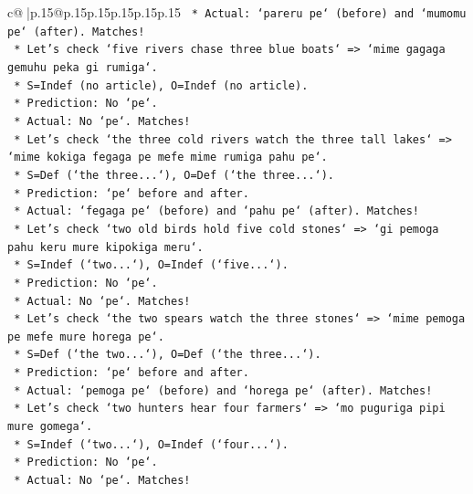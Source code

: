 \documentclass{article}
\begin{document}
{\begin{supertabular}{c@{$\;$}|p{.15\linewidth}@{}p{.15\linewidth}p{.15\linewidth}p{.15\linewidth}p{.15\linewidth}p{.15\linewidth}}
{{{\texttt{                    *   Actual: `pareru pe` (before) and `mumomu pe` (after). Matches!} \\
\texttt{                *   Let's check `five rivers chase three blue boats` => `mime gagaga gemuhu peka gi rumiga`.} \\
\texttt{                    *   S=Indef (no article), O=Indef (no article).} \\
\texttt{                    *   Prediction: No `pe`.} \\
\texttt{                    *   Actual: No `pe`. Matches!} \\
\texttt{                *   Let's check `the three cold rivers watch the three tall lakes` => `mime kokiga fegaga pe mefe mime rumiga pahu pe`.} \\
\texttt{                    *   S=Def (`the three...`), O=Def (`the three...`).} \\
\texttt{                    *   Prediction: `pe` before and after.} \\
\texttt{                    *   Actual: `fegaga pe` (before) and `pahu pe` (after). Matches!} \\
\texttt{                *   Let's check `two old birds hold five cold stones` => `gi pemoga pahu keru mure kipokiga meru`.} \\
\texttt{                    *   S=Indef (`two...`), O=Indef (`five...`).} \\
\texttt{                    *   Prediction: No `pe`.} \\
\texttt{                    *   Actual: No `pe`. Matches!} \\
\texttt{                *   Let's check `the two spears watch the three stones` => `mime pemoga pe mefe mure horega pe`.} \\
\texttt{                    *   S=Def (`the two...`), O=Def (`the three...`).} \\
\texttt{                    *   Prediction: `pe` before and after.} \\
\texttt{                    *   Actual: `pemoga pe` (before) and `horega pe` (after). Matches!} \\
\texttt{                *   Let's check `two hunters hear four farmers` => `mo puguriga pipi mure gomega`.} \\
\texttt{                    *   S=Indef (`two...`), O=Indef (`four...`).} \\
\texttt{                    *   Prediction: No `pe`.} \\
\texttt{                    *   Actual: No `pe`. Matches!} \\
}}}
\end{supertabular}}
\end{document}
